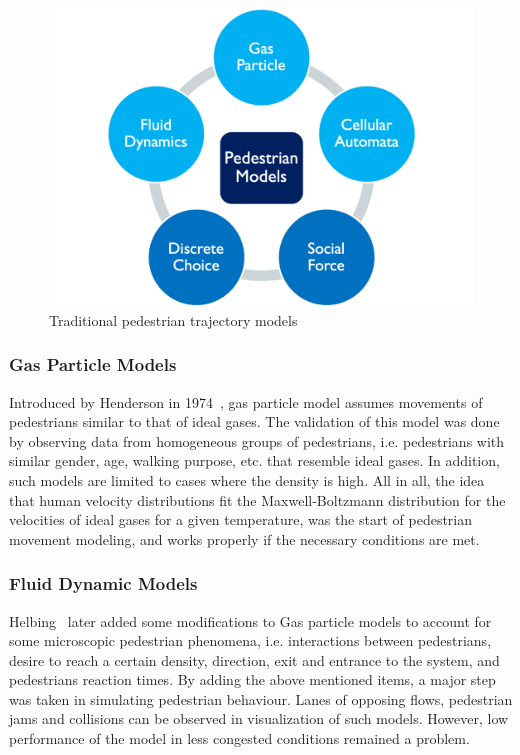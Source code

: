 \begin{figure}
    \centering
    \includegraphics[scale=0.5]{chapter_1b/figures/models.png}
    \caption{Traditional pedestrian trajectory models}
    \label{fig:tradtypes}
\end{figure}
\subsubsection{Gas Particle Models}
Introduced by Henderson in 1974~\cite{henderson1974fluid}, gas particle model assumes movements of pedestrians similar to that of ideal gases. The validation of this model was done by observing data from homogeneous groups of pedestrians, i.e. pedestrians with similar gender, age, walking purpose, etc. that resemble ideal gases. In addition, such models are limited to cases where the density is high. All in all, the idea that human velocity distributions fit the Maxwell-Boltzmann distribution for the velocities of ideal gases for a given temperature, was the start of pedestrian movement modeling, and works properly if the necessary conditions are met.

\subsubsection{Fluid Dynamic Models}
Helbing~\cite{helbing1998fluid} later added some modifications to Gas particle models to account for some microscopic pedestrian phenomena, i.e. interactions between pedestrians, desire to reach a certain density, direction, exit and entrance to the system, and pedestrians reaction times. By adding the above mentioned items, a major step was taken in simulating pedestrian behaviour. Lanes of opposing flows, pedestrian jams and collisions can be observed in visualization of such models. However, low performance of the model in less congested conditions remained a problem.

